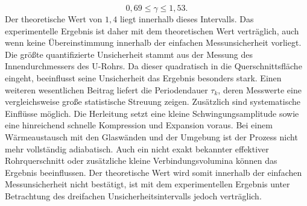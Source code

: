 \documentclass{report}
\begin{document}
\begin{equation}
0{,}69\leq\gamma\leq1{,}53.
\end{equation}
\noindent
Der theoretische Wert von $1{,}4$ liegt innerhalb dieses Intervalls.
Das experimentelle Ergebnis ist daher mit dem theoretischen Wert
verträglich, auch wenn keine Übereinstimmung innerhalb der einfachen
Messunsicherheit vorliegt.
\noindent
Die größte quantifizierte Unsicherheit stammt aus der Messung des
Innendurchmessers des U-Rohrs. Da dieser quadratisch in die
Querschnittsfläche eingeht, beeinflusst seine Unsicherheit das Ergebnis
besonders stark. Einen weiteren wesentlichen Beitrag liefert die
Periodendauer $\tau_k$, deren Messwerte eine vergleichsweise große
statistische Streuung zeigen.
\noindent
Zusätzlich sind systematische Einflüsse möglich. Die Herleitung setzt eine
kleine Schwingungsamplitude sowie eine hinreichend schnelle Kompression und
Expansion voraus. Bei einem Wärmeaustausch mit den Glaswänden und der
Umgebung ist der Prozess nicht mehr vollständig adiabatisch. Auch ein nicht
exakt bekannter effektiver Rohrquerschnitt oder zusätzliche kleine
Verbindungsvolumina können das Ergebnis beeinflussen.
\noindent
Der theoretische Wert wird somit innerhalb der einfachen Messunsicherheit
nicht bestätigt, ist mit dem experimentellen Ergebnis unter Betrachtung
des dreifachen Unsicherheitsintervalls jedoch verträglich.
\end{document}
